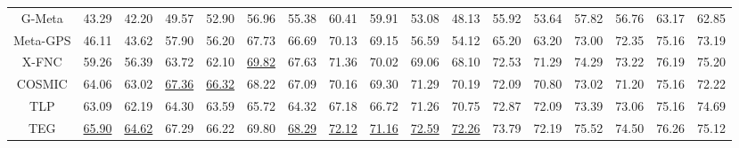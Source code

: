 \begin{table*}[ht]
{\begin{tabular}{@{}c|cccccccc|cccccccc@{}}
G-Meta                 & 43.29          & 42.20          & 49.57          & 52.90          & 56.96          & 55.38          & 60.41          & 59.91          & 53.08          & 48.13          & 55.92          & 53.64          & 57.82          & 56.76          & 63.17          & 62.85          \\
Meta-GPS               & 46.11          & 43.62          & 57.90          & 56.20          & 67.73          & 66.69          & 70.13          & 69.15          & 56.59          & 54.12          & 65.20          & 63.20          & 73.00          & 72.35          & 75.16          & 73.19          \\
X-FNC                   & 59.26    & 56.39    & 63.72    & 62.10    & \underline{69.82}    & 67.63    & 71.36    & 70.02    & 69.06          & 68.10          & 72.53          & 71.29          & 74.29    & 73.22    & 76.19    & 75.20    \\ 
COSMIC                   & 64.06    & 63.02    & \underline{67.36}    & \underline{66.32}    & 68.22    & 67.09    & 70.16    & 69.30    & 71.29          & 70.19          & 72.09          & 70.80          & 73.02    & 71.20    & 75.16    & 72.22    \\
TLP                   & 63.09    & 62.19    & 64.30    & 63.59    & 65.72    & 64.32    & 67.18    & 66.72    & 71.26          & 70.75          & 72.87          & 72.09          & 73.39    & 73.06    & 75.16    & 74.69    \\
TEG                   & \underline{65.90}    & \underline{64.62}    & 67.29    & 66.22    & 69.80    & \underline{68.29}    & \underline{72.12}    & \underline{71.16}    & \underline{72.59}          & \underline{72.26}          & 73.79          & 72.19          & 75.52    & 74.50    & 76.26    & 75.12    \\
\midrule

\end{tabular}}
\end{table*}
